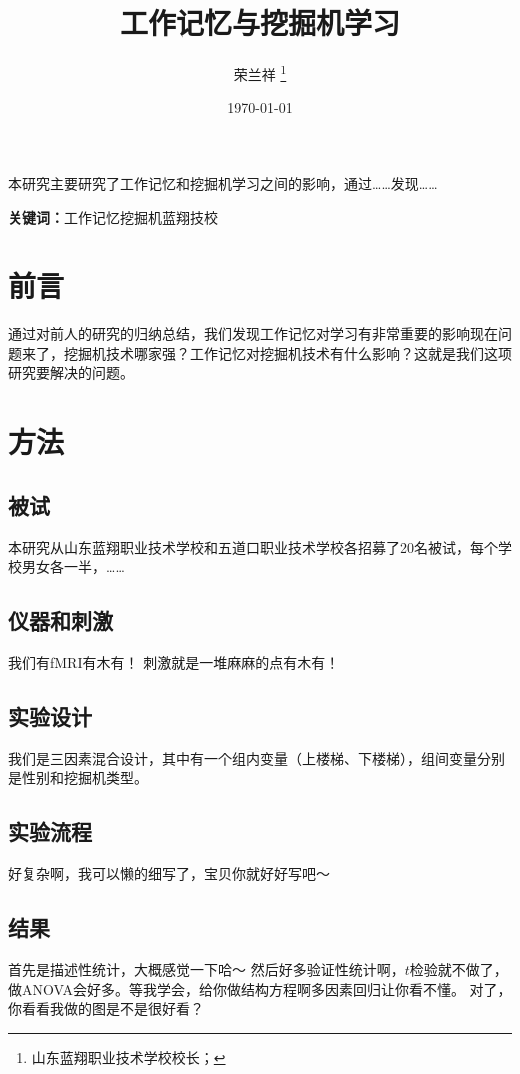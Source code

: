 \documentclass[UTF8,a4paper]{ctexart}
\title{\bfseries 工作记忆与挖掘机学习}
\author{荣兰祥 \thanks{山东蓝翔职业技术学校校长；}}
\date{\today}
\begin{document}
\maketitle


\begin{center}
\parbox{130mm}{
本研究主要研究了工作记忆和挖掘机学习之间的影响，通过……发现……
\par
\vspace{1mm}
{\bfseries 关键词：}工作记忆\quad 挖掘机\quad 蓝翔技校}
\end{center}



\section{前言}
通过对前人的研究的归纳总结，我们发现工作记忆对学习有非常重要的影响现在问题来了，挖掘机技术哪家强？工作记忆对挖掘机技术有什么影响？这就是我们这项研究要解决的问题。

\section{方法}
\subsection{被试}
本研究从山东蓝翔职业技术学校和五道口职业技术学校各招募了20名被试，每个学校男女各一半，……

\subsection{仪器和刺激}
我们有fMRI有木有！
刺激就是一堆麻麻的点有木有！

\subsection{实验设计}
我们是三因素混合设计，其中有一个组内变量（上楼梯、下楼梯），组间变量分别是性别和挖掘机类型。

\subsection{实验流程}
好复杂啊，我可以懒的细写了，宝贝你就好好写吧～

\subsection{结果}
首先是描述性统计，大概感觉一下哈～
然后好多验证性统计啊，$t$检验就不做了，做ANOVA会好多。等我学会，给你做结构方程啊多因素回归让你看不懂。
对了，你看看我做的图是不是很好看？
\end{document}
